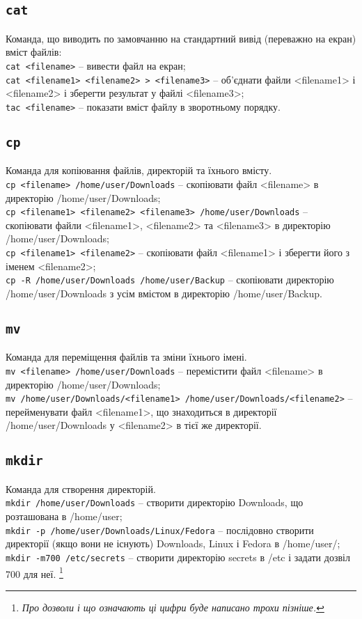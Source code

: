 \documentclass[10pt,a4paper]{fancyhandout}
\begin{document}
\subsection{\texttt{cat}}
Команда, що виводить по замовчанню на стандартний вивід (переважно на екран) вміст файлів: \\
\texttt{cat <filename>} -- вивести файл на екран; \\
\texttt{cat <filename1> <filename2> > <filename3>} -- об'єднати файли <filename1> і <filename2> і зберегти результат у файлі <filename3>; \\
\texttt{tac <filename>} -- показати вміст файлу в зворотньому порядку.
\goodbreak

\subsection{\texttt{cp}}
Команда для копіювання файлів, директорій та їхнього вмісту. \\
\texttt{cp <filename> /home/user/Downloads} -- скопіювати файл <filename> в директорію /home/user/Downloads; \\
\texttt{cp <filename1> <filename2> <filename3> /home/user/Downloads} -- скопіювати файли <filename1>, <filename2> та <filename3> в директорію /home/user/Downloads; \\
\texttt{cp <filename1> <filename2>} -- скопіювати файл <filename1> і зберегти його з іменем <filename2>; \\
\texttt{cp -R /home/user/Downloads /home/user/Backup} -- скопіювати директорію /home/user/Downloads з усім вмістом в директорію /home/user/Backup.
\goodbreak

\subsection{\texttt{mv}}
Команда для переміщення файлів та зміни їхнього імені. \\
\texttt{mv <filename> /home/user/Downloads} -- перемістити файл <filename> в директорію /home/user/Downloads; \\
\texttt{mv /home/user/Downloads/<filename1> /home/user/Downloads/<filename2>} -- перейменувати файл <filename1>, що знаходиться в директорії /home/user/Downloads у <filename2> в тієї же директорії. 
\goodbreak

\subsection{\texttt{mkdir}}
Команда для створення директорій. \\
\texttt{mkdir /home/user/Downloads} -- створити директорію Downloads, що розташована в /home/user; \\
\texttt{mkdir -p /home/user/Downloads/Linux/Fedora} -- послідовно створити директорії (якщо вони не існують) Downloads, Linux і Fedora в /home/user/; \\
\texttt{mkdir -m700 /etc/secrets} -- створити директорію secrets в /etc і задати дозвіл 700 для неї.
\footnote{\textit{Про дозволи і що означають ці цифри буде написано трохи пізніше. }}
\goodbreak
\end{document}
